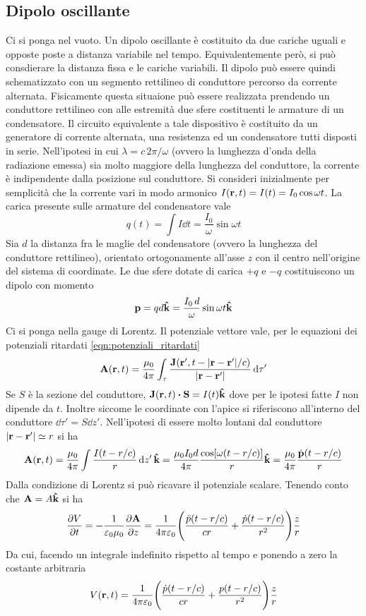 \subsection{Dipolo oscillante}
Ci si ponga nel vuoto.
Un dipolo oscillante è costituito da due cariche uguali e opposte poste a distanza variabile nel tempo.
Equivalentemente però, si può consdierare la distanza fissa e le cariche variabili. Il dipolo può essere
quindi schematizzato con un segmento rettilineo di conduttore
percorso da corrente alternata. Fisicamente questa situaione può essere realizzata prendendo un conduttore rettilineo
con alle estremità due sfere costituenti le armature di un condensatore. Il circuito equivalente a tale dispositivo
è costituito da un generatore di corrente alternata, una resistenza ed un condensatore tutti disposti in serie.
Nell'ipotesi in cui
$\lambda=c\,2\pi/\omega$ (ovvero la lunghezza d'onda della radiazione emessa) sia molto maggiore della
lunghezza del conduttore, la corrente è indipendente dalla posizione sul conduttore. Si consideri inizialmente
per semplicità che la corrente vari in modo armonico $I(\vb{r},t)=I(t)=I_0\cos{\omega t}$. La carica presente sulle armature del
condensatore vale
\[
    q(t)=\int I\dd{t}=\frac{I_0}{\omega}\sin{\omega t}
\]
Sia $d$ la distanza fra le maglie del condensatore (ovvero la lunghezza del conduttore rettilineo),
orientato ortogonamente all'asse $z$ con il centro nell'origine del sistema di coordinate.
Le due sfere dotate di carica $+q$ e $-q$ costituiscono un dipolo con momento
\[
    \vb{p}=qd\vu{k}=\frac{I_0\,d}{\omega}\sin{\omega t}\vu{k}
\]
Ci si ponga nella gauge di Lorentz. Il potenziale vettore vale,
per le equazioni dei potenziali ritardati \eqref{eqn:potenziali_ritardati}
\[
    \vb{A}(\vb{r},t)=\frac{\mu_0}{4\pi}\int_\tau
    \frac{\vb{J}(\vb{r}',t-\abs{\vb{r}-\vb{r}'}/c)}{\abs{\vb{r}-\vb{r}'}}\dd{\tau'}
\]
Se $S$ è la sezione del conduttore, $\vb{J}(\vb{r},t)\vdot\vb{S}=I(t)\vu{k}$ dove per le ipotesi fatte
$I$ non dipende da $t$.
Inoltre siccome le coordinate con l'apice si riferiscono all'interno del conduttore $\dd{\tau'}=S\dd{z'}$.
Nell'ipotesi di essere molto lontani dal conduttore $\abs{\vb{r}-\vb{r}'}\simeq r$ si ha
\[
    \vb{A}(\vb{r},t)=\frac{\mu_0}{4\pi}\int\frac{I(t-r/c)}{r}\dd{z'}\vu{k}=\frac{\mu_0 I_0 d}{4\pi}
    \frac{\cos[\omega(t-r/c)]}{r}\vu{k}=
    \frac{\mu_0}{4\pi}\frac{\dot{\vb{p}}(t-r/c)}{r}
\]
Dalla condizione di Lorentz si può ricavare il potenziale scalare. Tenendo conto che $\vb{A}=A\vu{k}$ si ha
\[
    \pdv{V}{t}=-\frac{1}{\varepsilon_0\mu_0}\pdv{\vb{A}}{z}=\frac{1}{4\pi\varepsilon_0}\Biggl(\frac{\ddot{p}(t-r/c)}{cr}+
    \frac{\dot{p}(t-r/c)}{r^2} \Biggr)\frac{z}{r}
\]
Da cui, facendo un integrale indefinito rispetto al tempo e ponendo a zero la costante arbitraria
\[
    V(\vb{r},t)=\frac{1}{4\pi\varepsilon_0}\Biggl(\frac{\dot{p}(t-r/c)}{cr}+ \frac{p(t-r/c)}{r^2} \Biggr)\frac{z}{r}
\]

